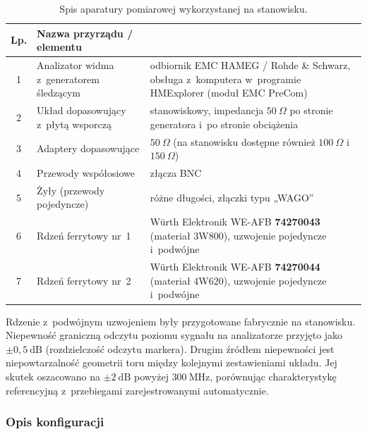 \documentclass[11pt,a4paper]{article}
\begin{document}
\begin{table}[H]
  \centering
  \small
  \caption{Spis aparatury pomiarowej wykorzystanej na stanowisku.}
  \label{tab:aparatura}
  \renewcommand{\arraystretch}{1.25}
  \begin{tabular}{|c|>{\raggedright\arraybackslash}p{4.4cm}|>{\raggedright\arraybackslash}p{7.2cm}|}
    \hline
    \textbf{Lp.} & \textbf{Nazwa przyrządu / elementu} & \multicolumn{1}{c|}{\textbf{Model lub typ}} \\
    \hline
    1 & Analizator widma z~generatorem śledzącym
      & odbiornik EMC HAMEG / Rohde \& Schwarz, obsługa z~komputera
        w~programie HMExplorer (moduł EMC PreCom) \\ %
    \hline
    2 & Układ dopasowujący z~płytą wsporczą
      & stanowiskowy, impedancja $50\ \Omega$ po stronie generatora
        i~po stronie obciążenia \\
    \hline
    3 & Adaptery dopasowujące
      & $50\ \Omega$ (na stanowisku dostępne również $100\ \Omega$ i~$150\ \Omega$) \\
    \hline
    4 & Przewody współosiowe & złącza BNC \\
    \hline
    5 & Żyły (przewody pojedyncze) & różne długości, złączki typu „WAGO” \\
    \hline
    6 & Rdzeń ferrytowy nr~1 & Würth Elektronik WE-AFB \textbf{74270043}
        (materiał 3W800), uzwojenie pojedyncze i~podwójne \\
    \hline
    7 & Rdzeń ferrytowy nr~2 & Würth Elektronik WE-AFB \textbf{74270044}
        (materiał 4W620), uzwojenie pojedyncze i~podwójne \\
    \hline
  \end{tabular}
\end{table}

Rdzenie z~podwójnym uzwojeniem były przygotowane fabrycznie na stanowisku.
Niepewność graniczną odczytu poziomu sygnału na analizatorze przyjęto jako
$\pm 0{,}5\ \mathrm{dB}$ (rozdzielczość odczytu markera). Drugim źródłem niepewności
jest niepowtarzalność geometrii toru między kolejnymi zestawieniami układu. Jej skutek
oszacowano na $\pm 2\ \mathrm{dB}$ powyżej $300\ \mathrm{MHz}$, porównując
charakterystykę referencyjną z~przebiegami zarejestrowanymi automatycznie.

\subsubsection{Opis konfiguracji}
\end{document}
